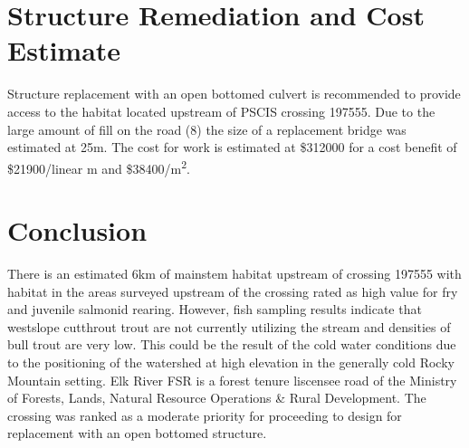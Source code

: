 \documentclass[
]{book}
\begin{document}
\hypertarget{structure-remediation-and-cost-estimate-7}{%
\section*{Structure Remediation and Cost Estimate}\label{structure-remediation-and-cost-estimate-7}}

Structure replacement with an open bottomed culvert is recommended to provide access to the habitat located upstream of PSCIS crossing 197555. Due to the large amount of fill on the road (8) the size of a replacement bridge was estimated at 25m. The cost for work is estimated at \$312000 for a cost benefit of \$21900/linear m and \$38400/m\textsuperscript{2}.

\hypertarget{conclusion-8}{%
\section*{Conclusion}\label{conclusion-8}}

There is an estimated 6km of mainstem habitat upstream of crossing 197555 with habitat in the areas surveyed upstream of the crossing rated as high value for fry and juvenile salmonid rearing. However, fish sampling results indicate that westslope cutthrout trout are not currently utilizing the stream and densities of bull trout are very low. This could be the result of the cold water conditions due to the positioning of the watershed at high elevation in the generally cold Rocky Mountain setting. Elk River FSR is a forest tenure liscensee road of the Ministry of Forests, Lands, Natural Resource Operations \& Rural Development. The crossing was ranked as a moderate priority for proceeding to design for replacement with an open bottomed structure.
\end{document}
